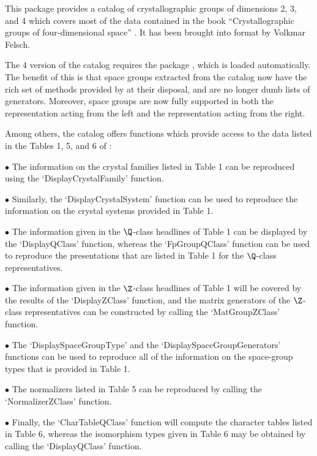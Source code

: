 \def\x{\times}



This package provides a catalog of crystallographic groups of
dimensions 2, 3, and 4 which covers most of the data contained 
in the book ``Crystallographic groups of four-dimensional space''
\cite{BBNWZ78}.  It has been brought into {\GAP} format by Volkmar
Felsch.

The {\GAP} 4 version of the catalog requires the package {\Cryst},
which is loaded automatically. The benefit of this is that space groups 
extracted from the catalog now have the rich set of methods provided
by {\Cryst} at their disposal, and are no longer dumb lists of generators.
Moreover, space groups are now fully supported in both the representation
acting from the left and the representation acting from the right.


Among others, the catalog offers functions which provide access to the
data listed in the Tables 1, 5, and 6 of \cite{BBNWZ78}:

\beginlist 
\item{$\bullet$} 
    The information on the crystal families listed in Table 1 can
    be reproduced using the `DisplayCrystalFamily' function.
\item{$\bullet$} 
    Similarly, the `DisplayCrystalSystem' function can be
    used to reproduce the information on the crystal systems
    provided in Table 1.
\item{$\bullet$} 
    The information given in the $\Q$-class headlines of
    Table 1 can be displayed by the `DisplayQClass' function,
    whereas the `FpGroupQClass' function can be used to reproduce
    the presentations that are listed in Table 1 for the $\Q$-class
    representatives.
\item{$\bullet$} 
    The information given in the $\Z$-class headlines of Table 1
    will be covered by the results of the `DisplayZClass' function,
    and the matrix generators of the $\Z$-class representatives can
    be constructed by calling the `MatGroupZClass' function.
\item{$\bullet$} 
    The `DisplaySpaceGroupType' and the
    `DisplaySpaceGroupGenerators' functions can be used to
    reproduce all of the information on the space-group types that
    is provided in Table 1.
\item{$\bullet$} 
    The normalizers listed in Table 5 can be reproduced by
    calling the `NormalizerZClass' function.
\item{$\bullet$} 
    Finally, the `CharTableQClass' function will compute the
    character tables listed in Table 6, whereas the isomorphism
    types given in Table 6 may be obtained by calling the
    `DisplayQClass' function.  
\endlist


